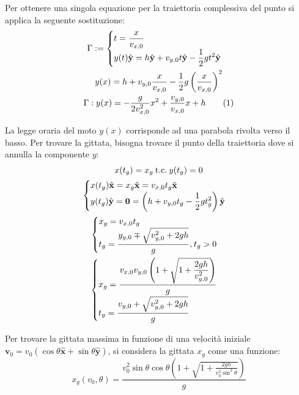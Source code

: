 \documentclass{article}
\newcommand{\vect}[1]{\boldsymbol{\mathbf{#1}}}
\numberwithin{equation}{subsection}
\begin{document}
Per ottenere una singola equazione per la traiettoria complessiva 
del punto si applica la seguente sostituzione:
\begin{gather*}
    \Gamma:=
    \begin{cases}
        \displaystyle t = \frac{x}{v_{x,0}}\\
        {y}(t)\hat{\vect{y}}=h\hat{\vect{y}}+v_{y,0}t\hat{\vect{y}}-\displaystyle\frac{1}{2}gt^{2}\hat{\vect{y}}
    \end{cases}\\
    \displaystyle y(x)=h+v_{y,0}\frac{x}{v_{x,0}}-\frac{1}{2}g\left(\frac{x}{v_{x,0}}\right)^{2}\\
    \Gamma:y(x)\displaystyle=-\frac{g}{2v_{x,0}^{2}}x^{2}+\frac{v_{y,0}}{v_{x,0}}x+h\tag{\stepcounter{equation}\theequation}
\end{gather*}

La legge oraria del moto $y(x)$ corrisponde ad una parabola rivolta verso 
il basso.
Per trovare la gittata, bisogna trovare il punto della traiettoria 
dove si annulla la componente $y$:
\begin{gather*}
    x(t_g)=x_g \:\mbox{t.c.}\:y(t_g)=0\\
    \begin{cases}
        x(t_g)\hat{\vect{x}}=x_g\hat{\vect{x}}=v_{x,0}t_g\hat{\vect{x}}\\
        y(t_g)\hat{\vect{y}}=\vect{0}=\left(h+v_{y,0}t_g-\displaystyle\frac{1}{2}gt_g^{2}\right)\hat{\vect{y}}
    \end{cases}\\
    \begin{cases}
        x_g=v_{x,0}t_g\\
        t_g=\displaystyle\frac{y_{y,0}\mp\sqrt{v_{y,0}^{2}+2gh}}{g}{,}\:t_g>0  
    \end{cases}\\
    \begin{cases}
        x_g=\displaystyle\frac{v_{x,0}v_{y,0}\left(1+\sqrt{1+\displaystyle\frac{2gh}{v_{y,0}^2}}\right)}{\strut g}\\
        t_g=\displaystyle\frac{v_{y,0}+\sqrt{v_{y,0}^{2}+2gh}}{g}    
    \end{cases}
\end{gather*}

Per trovare la gittata massima in funzione di una velocità 
iniziale $\vect{v}_0 = v_0(\cos\theta\hat{\vect{x}}+\sin\theta\hat{\vect{y}})$, 
si considera la gittata $x_g$ come una funzione:
\begin{equation}
    x_g(v_0,\theta)=\displaystyle\frac{v_0^{2}\sin\theta \cos\theta\left(1+\sqrt{1+\displaystyle\frac{2gh}{v_0^2\sin^2\theta}}\right)}{g}
\end{equation}
\end{document}
